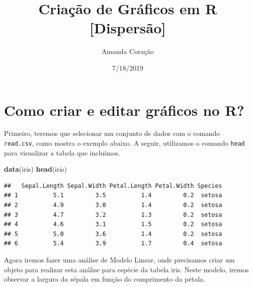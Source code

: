 \documentclass[]{article}
\title{Criação de Gráficos em R {[}Dispersão{]}}
\author{Amanda Coração}
\date{7/18/2019}
\newenvironment{Shaded}{\begin{snugshade}}{\end{snugshade}}
\newcommand{\CommentTok}[1]{\textcolor[rgb]{0.56,0.35,0.01}{\textit{#1}}}
\newcommand{\DataTypeTok}[1]{\textcolor[rgb]{0.13,0.29,0.53}{#1}}
\newcommand{\KeywordTok}[1]{\textcolor[rgb]{0.13,0.29,0.53}{\textbf{#1}}}
\newcommand{\NormalTok}[1]{#1}
\newcommand{\OperatorTok}[1]{\textcolor[rgb]{0.81,0.36,0.00}{\textbf{#1}}}
\newcommand{\StringTok}[1]{\textcolor[rgb]{0.31,0.60,0.02}{#1}}
\begin{document}
\maketitle

\hypertarget{como-criar-e-editar-graficos-no-r}{%
\section{Como criar e editar gráficos no
R?}\label{como-criar-e-editar-graficos-no-r}}

Primeiro, teremos que selecionar um conjunto de dados com o comando
\texttt{read.csv}, como mostra o exemplo abaixo. A seguir, utilizamos o
comando \texttt{head} para visualizar a tabela que incluímos.

\begin{Shaded}
\begin{Highlighting}[]
\KeywordTok{data}\NormalTok{(iris)}
\KeywordTok{head}\NormalTok{(iris)}
\end{Highlighting}
\end{Shaded}

\begin{verbatim}
##   Sepal.Length Sepal.Width Petal.Length Petal.Width Species
## 1          5.1         3.5          1.4         0.2  setosa
## 2          4.9         3.0          1.4         0.2  setosa
## 3          4.7         3.2          1.3         0.2  setosa
## 4          4.6         3.1          1.5         0.2  setosa
## 5          5.0         3.6          1.4         0.2  setosa
## 6          5.4         3.9          1.7         0.4  setosa
\end{verbatim}

Agora iremos fazer uma análise de Modelo Linear, onde precisamos criar
um objeto para realizar esta análise para espécie da tabela iris. Neste
modelo, iremos observar a largura da sépala em função do comprimento da
pétala.

\begin{Shaded}
\end{Shaded}
\end{document}
